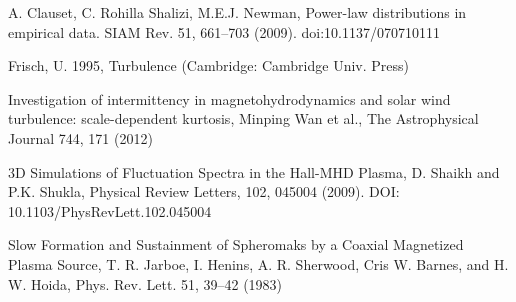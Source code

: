 \documentclass[12pt]{iopart}
\begin{document}
\begin{thebibliography}{10}
A. Clauset, C. Rohilla Shalizi, M.E.J. Newman, Power-law distributions in empirical data. SIAM Rev. 51, 661–703 (2009). doi:10.1137/070710111

Frisch, U. 1995, Turbulence (Cambridge: Cambridge Univ. Press)

Investigation of intermittency in magnetohydrodynamics and solar wind turbulence: scale-dependent kurtosis, Minping Wan et al., The Astrophysical Journal 744, 171 (2012)

3D Simulations of Fluctuation Spectra in the Hall-MHD Plasma, D. Shaikh and P.K. Shukla, Physical Review Letters, 102, 045004 (2009). DOI:	10.1103/PhysRevLett.102.045004

Slow Formation and Sustainment of Spheromaks by a Coaxial Magnetized Plasma Source, T. R. Jarboe, I. Henins, A. R. Sherwood, Cris W. Barnes, and H. W. Hoida,
Phys. Rev. Lett. 51, 39–42 (1983)


\end{thebibliography}
\end{document}
